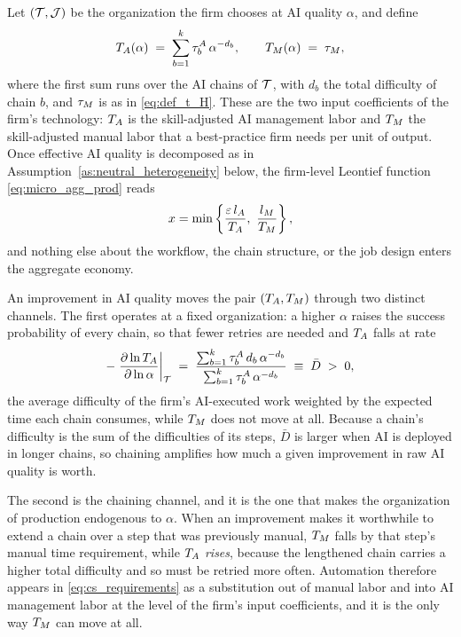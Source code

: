 Let $(\mathcal{T}, \mathcal{J})$ be the organization the firm chooses at AI quality $\alpha$, and define
\begin{equation}
T_{A}(\alpha) \;=\; \sum_{b=1}^{k} \tau^{A}_{b}\,\alpha^{-d_{b}},
\qquad
T_{M}(\alpha) \;=\; \tau_{M},
\label{eq:cs_requirements}
\end{equation}
where the first sum runs over the AI chains of $\mathcal{T}$, with $d_b$ the total difficulty of chain $b$, and $\tau_{M}$ is as in \eqref{eq:def_t_H}.
These are the two input coefficients of the firm's technology: $T_{A}$ is the skill-adjusted AI management labor and $T_{M}$ the skill-adjusted manual labor that a best-practice firm needs per unit of output.
Once effective AI quality is decomposed as in Assumption~\ref{as:neutral_heterogeneity} below, the firm-level Leontief function \eqref{eq:micro_agg_prod} reads
\begin{equation}
x = \min\left\{\frac{\varepsilon\,\labor{\AIletter}}{T_{\AIletter}},\ \frac{\labor{\manualLetter}}{T_{\manualLetter}}\right\},
\label{eq:cs_micro_prod}
\end{equation}
and nothing else about the workflow, the chain structure, or the job design enters the aggregate economy.

An improvement in AI quality moves the pair $(T_{A}, T_{M})$ through two distinct channels.
The first operates at a fixed organization: a higher $\alpha$ raises the success probability of every chain, so that fewer retries are needed and $T_{A}$ falls at rate
\begin{equation}
-\left.\frac{\partial \ln T_{A}}{\partial \ln \alpha}\right|_{\mathcal{T}}
\;=\;
\frac{\sum_{b=1}^{k}\tau^{A}_{b}\,d_{b}\,\alpha^{-d_{b}}}{\sum_{b=1}^{k}\tau^{A}_{b}\,\alpha^{-d_{b}}}
\;\equiv\; \bar{D} \;>\; 0,
\label{eq:cs_passthrough}
\end{equation}
the average difficulty of the firm's AI-executed work weighted by the expected time each chain consumes, while $T_{M}$ does not move at all.
Because a chain's difficulty is the sum of the difficulties of its steps, $\bar{D}$ is larger when AI is deployed in longer chains, so chaining amplifies how much a given improvement in raw AI quality is worth.

The second is the chaining channel, and it is the one that makes the organization of production endogenous to $\alpha$.
When an improvement makes it worthwhile to extend a chain over a step that was previously manual, $T_{M}$ falls by that step's manual time requirement, while $T_{A}$ \emph{rises}, because the lengthened chain carries a higher total difficulty and so must be retried more often.
Automation therefore appears in \eqref{eq:cs_requirements} as a substitution out of manual labor and into AI management labor at the level of the firm's input coefficients, and it is the only way $T_{M}$ can move at all.

